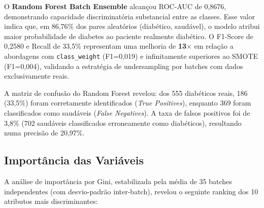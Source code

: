 \documentclass[12pt, a4paper]{article}
\begin{document}
    O \textbf{Random Forest Batch Ensemble} alcançou ROC-AUC de 0,8676, demonstrando capacidade discriminatória substancial entre as classes. Esse valor indica que, em 86,76\% dos pares aleatórios (diabético, saudável), o modelo atribui maior probabilidade de diabetes ao paciente realmente diabético. O F1-Score de 0,2580 e Recall de 33,5\% representam uma melhoria de \textbf{13$\times$} em relação a abordagens com \texttt{class\_weight} (F1=0,019) e infinitamente superiores ao SMOTE (F1=0,004), validando a estratégia de undersampling por batches com dados exclusivamente reais.

    A matriz de confusão do Random Forest revelou: dos 555 diabéticos reais, 186 (33,5\%) foram corretamente identificados (\textit{True Positives}), enquanto 369 foram classificados como saudáveis (\textit{False Negatives}). A taxa de falsos positivos foi de 3,8\% (702 saudáveis classificados erroneamente como diabéticos), resultando numa precisão de 20,97\%.

    \subsection{Importância das Variáveis}

    A análise de importância por Gini, estabilizada pela média de 35 batches independentes (com desvio-padrão inter-batch), revelou o seguinte ranking dos 10 atributos mais discriminantes:
\end{document}
